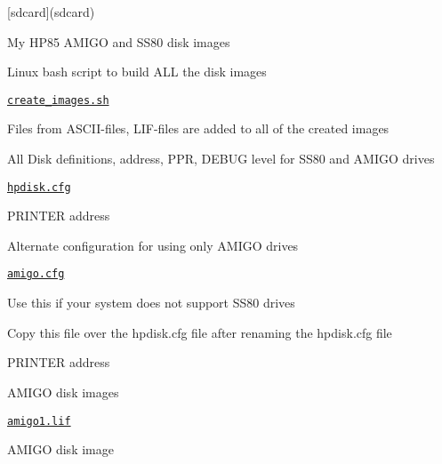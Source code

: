 \begin{DoxyItemize}
\item \mbox{[}sdcard\mbox{]}(sdcard)
\begin{DoxyItemize}
\item My H\+P85 A\+M\+I\+GO and S\+S80 disk images
\begin{DoxyItemize}
\item Linux bash script to build A\+LL the disk images
\begin{DoxyItemize}
\item \href{sdcard/create_images.sh}{\tt create\+\_\+images.\+sh}
\begin{DoxyItemize}
\item Files from A\+S\+C\+I\+I-\/files, L\+I\+F-\/files are added to all of the created images
\end{DoxyItemize}
\end{DoxyItemize}
\item All Disk definitions, address, P\+PR, D\+E\+B\+UG level for S\+S80 and A\+M\+I\+GO drives
\begin{DoxyItemize}
\item \href{sdcard/hpdisk.cfg}{\tt hpdisk.\+cfg}
\begin{DoxyItemize}
\item P\+R\+I\+N\+T\+ER address
\end{DoxyItemize}
\end{DoxyItemize}
\item Alternate configuration for using only A\+M\+I\+GO drives
\begin{DoxyItemize}
\item \href{sdcard/amigo.cfg}{\tt amigo.\+cfg}
\begin{DoxyItemize}
\item Use this if your system does not support S\+S80 drives
\begin{DoxyItemize}
\item Copy this file over the hpdisk.\+cfg file after renaming the hpdisk.\+cfg file
\end{DoxyItemize}
\item P\+R\+I\+N\+T\+ER address
\end{DoxyItemize}
\end{DoxyItemize}
\item A\+M\+I\+GO disk images
\begin{DoxyItemize}
\item \href{sdcard/amigo0.lif}{\tt amigo1.\+lif}
\begin{DoxyItemize}
\item A\+M\+I\+GO disk image

\end{DoxyItemize}
\end{DoxyItemize}
\end{DoxyItemize}
\end{DoxyItemize}
\end{DoxyItemize}
